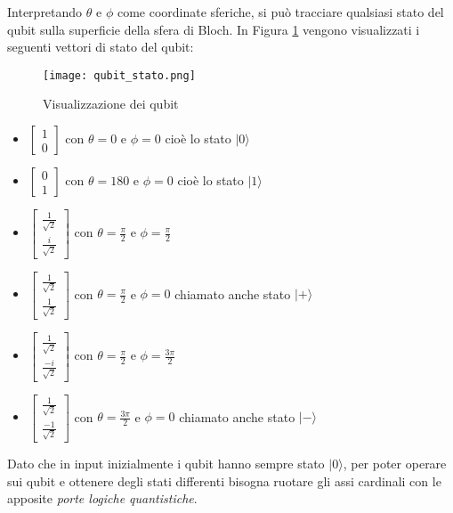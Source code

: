 Interpretando \(\theta\) e \(\phi\) come coordinate sferiche, si può tracciare qualsiasi stato del qubit sulla superficie della sfera di Bloch. In Figura \ref{fig:qubit_stato} vengono visualizzati i seguenti vettori di stato del qubit:

\begin{figure}[h]
  \centering
  \texttt{[image: qubit\_stato.png]}
  \caption{Visualizzazione dei qubit}
  \label{fig:qubit_stato}
\end{figure}

\begin{itemize}
  \item \( \begin{bmatrix} 1 \\ 0 \end{bmatrix} \) con \( \theta = 0 \) e \(\phi = 0\) cioè lo stato \( | 0 \rangle \)
  \item \( \begin{bmatrix} 0 \\ 1 \end{bmatrix} \) con \( \theta = 180 \) e \(\phi = 0\) cioè lo stato \( | 1 \rangle \)
  \item \( \begin{bmatrix} \frac{1}{\sqrt{2}} \\ \frac{i}{\sqrt{2}} \end{bmatrix} \) con \( \theta = \frac{\pi}{2} \) e \( \phi = \frac{\pi}{2} \)
  \item \( \begin{bmatrix} \frac{1}{\sqrt{2}} \\ \frac{1}{\sqrt{2}} \end{bmatrix} \) con \( \theta = \frac{\pi}{2} \) e \( \phi = 0 \) chiamato anche stato \( | + \rangle \)
  \item \( \begin{bmatrix} \frac{1}{\sqrt{2}} \\ \frac{-i}{\sqrt{2}} \end{bmatrix} \) con \( \theta = \frac{\pi}{2} \) e \( \phi = \frac{3\pi}{2} \)
  \item \( \begin{bmatrix} \frac{1}{\sqrt{2}} \\ \frac{-1}{\sqrt{2}} \end{bmatrix} \) con \( \theta = \frac{3\pi}{2} \) e \( \phi = 0 \) chiamato anche stato \( | - \rangle \)
\end{itemize}

Dato che in input inizialmente i qubit hanno sempre stato \( | 0 \rangle \), per poter operare sui qubit e ottenere degli stati differenti bisogna ruotare gli assi cardinali con le apposite \textit{porte logiche quantistiche}.

